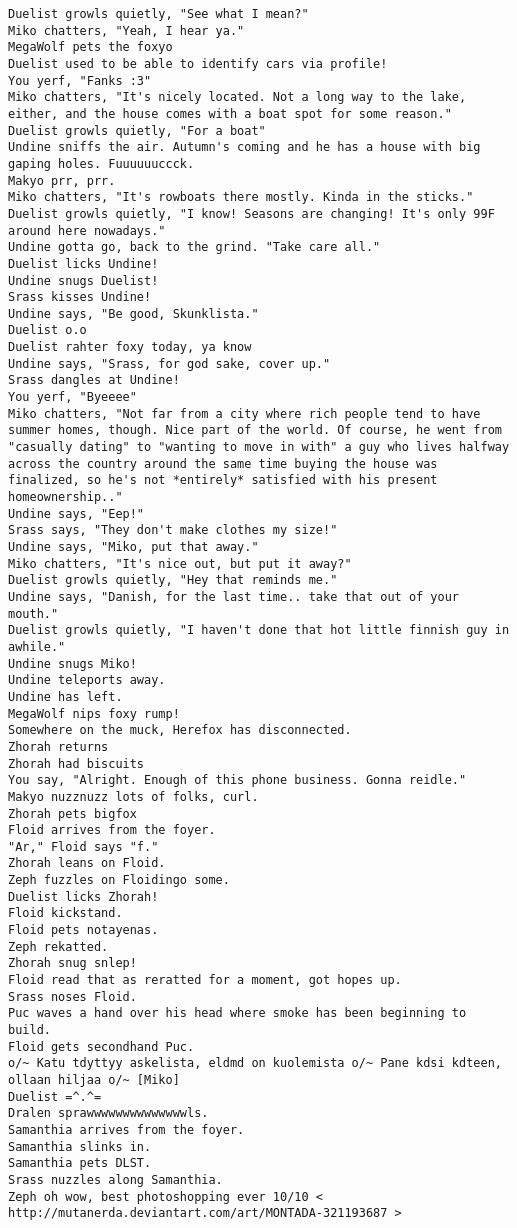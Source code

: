 \begin{verbatim}
Duelist growls quietly, "See what I mean?"
Miko chatters, "Yeah, I hear ya."
MegaWolf pets the foxyo
Duelist used to be able to identify cars via profile!
You yerf, "Fanks :3"
Miko chatters, "It's nicely located. Not a long way to the lake, either, and the house comes with a boat spot for some reason."
Duelist growls quietly, "For a boat"
Undine sniffs the air. Autumn's coming and he has a house with big gaping holes. Fuuuuuuccck.
Makyo prr, prr.
Miko chatters, "It's rowboats there mostly. Kinda in the sticks."
Duelist growls quietly, "I know! Seasons are changing! It's only 99F around here nowadays."
Undine gotta go, back to the grind. "Take care all."
Duelist licks Undine!
Undine snugs Duelist!
Srass kisses Undine!
Undine says, "Be good, Skunklista."
Duelist o.o
Duelist rahter foxy today, ya know
Undine says, "Srass, for god sake, cover up."
Srass dangles at Undine!
You yerf, "Byeeee"
Miko chatters, "Not far from a city where rich people tend to have summer homes, though. Nice part of the world. Of course, he went from "casually dating" to "wanting to move in with" a guy who lives halfway across the country around the same time buying the house was finalized, so he's not *entirely* satisfied with his present homeownership.."
Undine says, "Eep!"
Srass says, "They don't make clothes my size!"
Undine says, "Miko, put that away."
Miko chatters, "It's nice out, but put it away?"
Duelist growls quietly, "Hey that reminds me."
Undine says, "Danish, for the last time.. take that out of your mouth."
Duelist growls quietly, "I haven't done that hot little finnish guy in awhile."
Undine snugs Miko!
Undine teleports away.
Undine has left.
MegaWolf nips foxy rump!
Somewhere on the muck, Herefox has disconnected.
Zhorah returns
Zhorah had biscuits
You say, "Alright. Enough of this phone business. Gonna reidle."
Makyo nuzznuzz lots of folks, curl.
Zhorah pets bigfox
Floid arrives from the foyer.
"Ar," Floid says "f."
Zhorah leans on Floid.
Zeph fuzzles on Floidingo some.
Duelist licks Zhorah!
Floid kickstand.
Floid pets notayenas.
Zeph rekatted.
Zhorah snug snlep!
Floid read that as reratted for a moment, got hopes up.
Srass noses Floid.
Puc waves a hand over his head where smoke has been beginning to build.
Floid gets secondhand Puc.
o/~ Katu tdyttyy askelista, eldmd on kuolemista o/~ Pane kdsi kdteen, ollaan hiljaa o/~ [Miko]
Duelist =^.^=
Dralen sprawwwwwwwwwwwwwwls.
Samanthia arrives from the foyer.
Samanthia slinks in.  
Samanthia pets DLST.
Srass nuzzles along Samanthia.
Zeph oh wow, best photoshopping ever 10/10 < http://mutanerda.deviantart.com/art/MONTADA-321193687 >

\end{verbatim}
